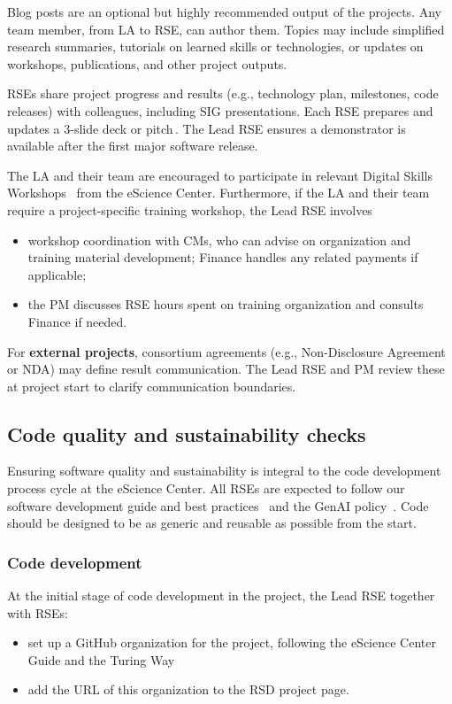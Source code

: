 Blog posts are an optional but highly recommended output of the projects. Any team member, from LA to RSE, can author them. 
Topics may include simplified research summaries, tutorials on learned skills or technologies, or updates on workshops, publications, and other project outputs.

RSEs share project progress and results (e.g., technology plan, milestones, code releases) with colleagues, 
including SIG presentations. Each RSE prepares and updates a 3-slide deck or pitch \cite{proj-portfolio}. 
The Lead RSE ensures a demonstrator is available after the first major software release.


The LA and their team are encouraged to participate in relevant Digital Skills Workshops~\cite{digital-skills} from the eScience Center. Furthermore, if the LA and their team
require a project-specific training workshop, the Lead RSE involves
\begin{itemize}
\item workshop coordination with CMs, who can advise on organization and training material development; Finance handles any related payments if applicable;
\item the PM discusses RSE hours spent on training organization and consults Finance if needed.
\end{itemize}

For \textbf{external projects}, consortium agreements (e.g., Non-Disclosure Agreement or NDA) may define result communication. The Lead RSE and PM review these at project start to clarify communication boundaries.

\subsection{Code quality and sustainability checks}
Ensuring software quality and sustainability is integral to the code development process cycle at the eScience
Center. All RSEs are expected to follow our software development guide and best practices~\cite{guide-nlesc} and the GenAI policy~\cite{nlesc2023genai}. Code should be 
designed to be as generic and reusable as possible from the start.

\subsubsection{Code development}
\label{sec:exec:code}
At the initial stage of code development in the project, the Lead RSE together with RSEs:
\begin{itemize}\itemsep0em
\item set up a GitHub organization for the project, following the eScience Center Guide and the Turing Way~\cite{the_turing_way-2023}
\item add the URL of this organization to the RSD project page.
\end{itemize}

